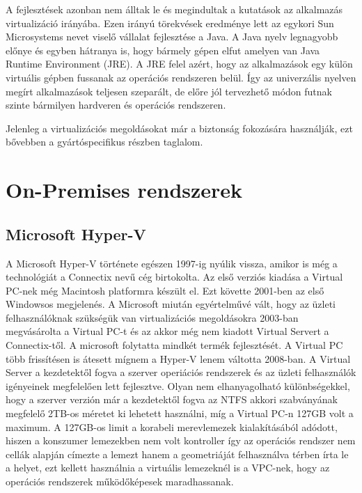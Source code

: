 \documentclass[12pt,oneside,justify,table]{book}
\begin{document}
A fejlesztések azonban nem álltak le és megindultak a kutatások az alkalmazás virtualizáció irányába. 
Ezen irányú törekvések eredménye lett az egykori Sun Microsystems nevet viselő vállalat fejlesztése a Java. 
A Java nyelv legnagyobb előnye és egyben hátranya is, hogy bármely gépen elfut amelyen van Java Runtime Environment (JRE). 
A JRE felel azért, hogy az alkalmazások egy külön virtuális gépben fussanak az operációs rendszeren belül. 
Így az univerzális nyelven megírt alkalmazások teljesen szeparált, de előre jól tervezhető módon futnak szinte bármilyen hardveren és operációs rendszeren.

Jelenleg a virtualizációs megoldásokat már a biztonság fokozására használják, ezt bővebben a gyártóspecifikus részben taglalom.

\section{On-Premises rendszerek}

\subsection{Microsoft Hyper-V\texttrademark}

A Microsoft Hyper-V története egészen 1997-ig nyúlik vissza, amikor is még a technológiát a Connectix nevű cég birtokolta. 
Az első verziós kiadása a Virtual PC-nek még Macintosh platformra készült el. 
Ezt követte 2001-ben az első Windowsos megjelenés. 
A Microsoft miután egyértelművé vált, hogy az üzleti felhasználóknak szükségük van virtualizációs megoldásokra 2003-ban megvásárolta a Virtual PC-t és az akkor még nem kiadott Virtual Servert a Connectix-től. 
A microsoft folytatta mindkét termék fejlesztését. A Virtual PC több frissítésen is átesett mígnem a Hyper-V lenem váltotta 2008-ban. 
A Virtual Server a kezdetektől fogva a szerver operiációs rendszerek és az üzleti felhasználók igényeinek megfelelően lett fejlesztve. 
Olyan nem elhanyagolható különbségekkel, hogy a szerver verzión már a kezdetektől fogva az NTFS akkori szabványának megfelelő 2TB-os méretet ki lehetett használni, míg a Virtual PC-n 127GB volt a maximum. 
A 127GB-os limit a korabeli merevlemezek kialakításából adódott, hiszen a konszumer lemezekben nem volt kontroller így az operációs rendszer nem cellák alapján címezte a lemezt hanem a geometriáját felhasználva térben írta le a helyet, ezt kellett használnia a virtuális lemezeknél is a VPC-nek, hogy az operációs rendszerek működőképesek maradhassanak.
\end{document}
